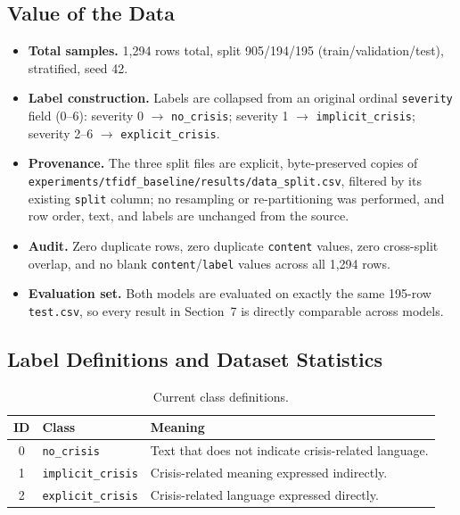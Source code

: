 \documentclass[12pt,a4paper]{article}
\newcommand{\pbrk}{\discretionary{}{}{}}
\begin{document}
\subsection{Value of the Data}

\begin{itemize}[nosep]
  \item \textbf{Total samples.} 1{,}294 rows total, split 905/194/195 (train/validation/test), stratified, seed 42.
  \item \textbf{Label construction.} Labels are collapsed from an original ordinal \texttt{severity} field (0--6): severity 0 $\rightarrow$ \texttt{no\_crisis}; severity 1 $\rightarrow$ \texttt{implicit\_crisis}; severity 2--6 $\rightarrow$ \texttt{explicit\_crisis}.
  \item \textbf{Provenance.} The three split files are explicit, byte-preserved copies of \texttt{experiments/\pbrk tfidf\_baseline/\pbrk results/\pbrk data\_split.csv}, filtered by its existing \texttt{split} column; no resampling or re-partitioning was performed, and row order, text, and labels are unchanged from the source.
  \item \textbf{Audit.} Zero duplicate rows, zero duplicate \texttt{content} values, zero cross-split overlap, and no blank \texttt{content}/\texttt{label} values across all 1{,}294 rows.
  \item \textbf{Evaluation set.} Both models are evaluated on exactly the same 195-row \texttt{test.csv}, so every result in Section~7 is directly comparable across models.
\end{itemize}

\subsection{Label Definitions and Dataset Statistics}

\begin{table}[H]
\centering
\caption{Current class definitions.}
\begin{tabular}{clp{7.5cm}}
\toprule
\textbf{ID} & \textbf{Class} & \textbf{Meaning} \\
\midrule
0 & \texttt{no\_crisis} & Text that does not indicate crisis-related language. \\
1 & \texttt{implicit\_crisis} & Crisis-related meaning expressed indirectly. \\
2 & \texttt{explicit\_crisis} & Crisis-related language expressed directly. \\
\bottomrule
\end{tabular}
\end{table}
\end{document}
